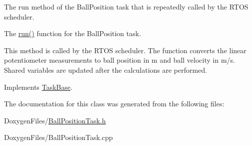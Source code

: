 The run method of the Ball\+Position task that is repeatedly called by the R\+T\+OS scheduler. 

The {\ttfamily \mbox{\hyperlink{class_ball_position_task_aa48c00fc26b05fe4f3c0cc8eed70fce4}{run()}}} function for the Ball\+Position task.

This method is called by the R\+T\+OS scheduler. The function converts the linear potentiometer measurements to ball position in m and ball velocity in m/s. Shared variables are updated after the calculations are performed. 

Implements \mbox{\hyperlink{class_task_base_adcf6036ad9c860051ccf392ba5e7dbbc}{Task\+Base}}.



The documentation for this class was generated from the following files\+:\begin{DoxyCompactItemize}
\item 
Doxygen\+Files/\mbox{\hyperlink{_ball_position_task_8h}{Ball\+Position\+Task.\+h}}\item 
Doxygen\+Files/Ball\+Position\+Task.\+cpp\end{DoxyCompactItemize}
